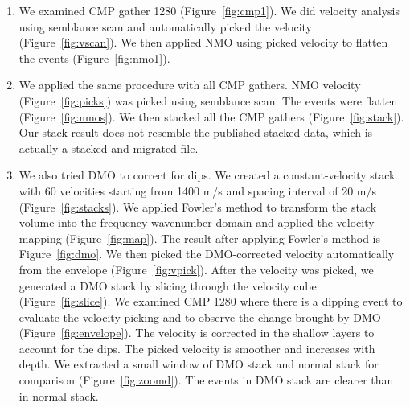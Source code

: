 \begin{enumerate}

\item We examined CMP gather 1280 (Figure~\ref{fig:cmp1}). We did velocity analysis using semblance scan and automatically picked the velocity (Figure~\ref{fig:vscan}). We then applied NMO using picked velocity to flatten the events (Figure~\ref{fig:nmo1}).   


\item We applied the same procedure with all CMP gathers. NMO velocity (Figure~\ref{fig:picks}) was picked using semblance scan. The events were flatten (Figure~\ref{fig:nmos}). We then stacked all the CMP gathers (Figure~\ref{fig:stack}). Our stack result does not resemble the published stacked data, which is actually a stacked and migrated file.


\item We also tried DMO to correct for dips. We created a constant-velocity stack with 60 velocities starting from 1400 m/s and spacing interval of 20 m/s (Figure~\ref{fig:stacks}). We applied Fowler's method \cite[]{Fowler.sepphd.58} to transform the stack volume into the frequency-wavenumber domain and applied the velocity mapping (Figure~\ref{fig:map}). The result after applying Fowler's method is Figure~\ref{fig:dmo}. We then picked the DMO-corrected velocity automatically from the envelope (Figure~\ref{fig:vpick}). After the velocity was picked, we generated a DMO stack by slicing through the velocity cube (Figure~\ref{fig:slice}). We examined CMP 1280 where there is a dipping event to evaluate the velocity picking and to observe the change brought by DMO (Figure~\ref{fig:envelope}). The velocity is corrected in the shallow layers to account for the dips. The picked velocity is smoother and increases with depth. We extracted a small window of DMO stack and normal stack for comparison (Figure~\ref{fig:zoomd}). The events in DMO stack are clearer than in normal stack.       


\end{enumerate}\clearpage

